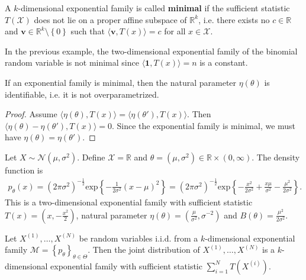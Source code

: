 \begin{defi}
  A \( k \)-dimensional exponential family is called \textbf{minimal} if the sufficient statistic \( T(\mathcal X) \) does not lie on a proper affine subspace of \( \mathbb{R}^k \), i.e. there exists no \( c \in \mathbb{R} \) and \( \mathbf v \in \mathbb{R}^k \setminus \left\{ 0 \right\} \)  such that \( \langle \mathbf v, T(x) \rangle = c \) for all \( x \in \mathcal{X} \).
\end{defi}

\begin{eg}
  In the previous example, the two-dimensional exponential family of the binomial random variable is not minimal since \( \langle \mathbf 1 , T(x) \rangle = n \) is a constant.
\end{eg}

\begin{prop}
  If an exponential family is minimal, then the natural parameter \( \eta(\theta) \) is identifiable, i.e. it is not overparametrized.
\end{prop}

\begin{proof}
  Assume \( \langle \eta(\theta), T(x) \rangle = \langle \eta(\theta'), T(x) \rangle \). Then \( \langle \eta(\theta) - \eta(\theta'), T(x) \rangle = 0 \). Since the exponential family is minimal, we must have \( \eta(\theta) = \eta(\theta') \).
\end{proof}

\begin{eg}
  Let \( X \sim \mathcal{N}(\mu, \sigma^2) \). Define \( \mathcal{X} = \mathbb R \) and \( \theta = (\mu, \sigma^2) \in \mathbb R  \times (0, \infty )\). The density function is 
  \begin{align*}
    p_\theta(x) = \left( 2\pi \sigma^2 \right)^{-\frac{1}{2}} \mathrm{exp}\left\{ -\frac{1}{2\sigma^2} (x - \mu)^2 \right\} = \left( 2 \pi \sigma^2 \right)^{-\frac{1}{2}}\mathrm{exp}\left\{ -\frac{x^2}{2\sigma^2} + \frac{x\mu}{\sigma^2} - \frac{\mu^2}{2\sigma^2} \right\}.
  \end{align*}
  This is a two-dimensional exponential family with sufficient statistic \( T(x) = (x, -\frac{x^2}{2}) \), natural parameter \( \eta(\theta) = (\frac{\mu}{\sigma^2}, \sigma^{-2}) \) and \( B(\theta) = \frac{\mu^2}{2\sigma^2} \).
\end{eg}

\begin{prop}
  Let \( X^{(1)}, \dots, X^{(N)} \) be random variables i.i.d. from a \( k \)-dimensional exponential family \( \mathcal{M} = \left\{ p_\theta \right\}_{\theta \in \Theta} \). Then the joint distribution of \( X^{(1)}, \dots, X^{(N)} \) is a \( k \)-dimensional exponential family with sufficient statistic \( \sum^N_{i=1}T(X^{(i)}) \).
\end{prop}

